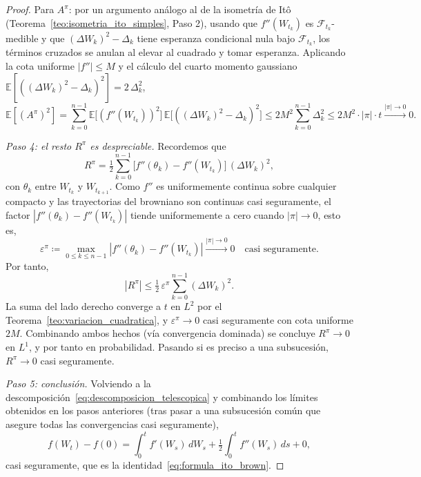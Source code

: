 \documentclass[11pt,a4paper,oneside]{report}
\theoremstyle{plain}
\theoremstyle{definition}
\theoremstyle{remark}
\newcommand{\E}{\mathbb{E}}
\newcommand{\F}{\mathcal{F}}
\newcommand{\1}{\mathbf{1}}
\newcommand{\eqdef}{\coloneqq}
\begin{document}
\begin{proof}
Para $A^\pi$: por un argumento análogo al de la isometría de Itô
(Teorema~\ref{teo:isometria_ito_simples}, Paso 2), usando que
$f''(W_{t_k})$ es $\F_{t_k}$-medible y que $(\Delta W_k)^2 - \Delta_k$
tiene esperanza condicional nula bajo $\F_{t_k}$, los términos
cruzados se anulan al elevar al cuadrado y tomar esperanza. Aplicando
la cota uniforme $|f''| \leq M$ y el cálculo del cuarto momento
gaussiano $\E[((\Delta W_k)^2 - \Delta_k)^2] = 2\, \Delta_k^2$,
\begin{equation*}
  \E[(A^\pi)^2]
  = \sum_{k=0}^{n-1} \E\bigl[(f''(W_{t_k}))^2\bigr]\,
    \E\bigl[((\Delta W_k)^2 - \Delta_k)^2\bigr]
  \leq 2 M^2 \sum_{k=0}^{n-1} \Delta_k^2
  \leq 2 M^2 \cdot |\pi| \cdot t \xrightarrow{|\pi| \to 0} 0.
\end{equation*}

\emph{Paso 4: el resto $R^\pi$ es despreciable.} Recordemos que
\begin{equation*}
  R^\pi = \tfrac{1}{2} \sum_{k=0}^{n-1}
            \bigl[f''(\theta_k) - f''(W_{t_k})\bigr]\, (\Delta W_k)^2,
\end{equation*}
con $\theta_k$ entre $W_{t_k}$ y $W_{t_{k+1}}$. Como $f''$ es uniformemente
continua sobre cualquier compacto y las trayectorias del browniano son
continuas casi seguramente, el factor $|f''(\theta_k) - f''(W_{t_k})|$
tiende uniformemente a cero cuando $|\pi| \to 0$, esto es,
\begin{equation*}
  \varepsilon^\pi \eqdef \max_{0 \leq k \leq n-1}
                          |f''(\theta_k) - f''(W_{t_k})|
                          \xrightarrow{|\pi| \to 0} 0
  \quad \text{casi seguramente}.
\end{equation*}
Por tanto,
\begin{equation*}
  |R^\pi| \leq \tfrac{1}{2}\, \varepsilon^\pi
              \sum_{k=0}^{n-1} (\Delta W_k)^2.
\end{equation*}
La suma del lado derecho converge a $t$ en $L^2$ por el
Teorema~\ref{teo:variacion_cuadratica}, y $\varepsilon^\pi \to 0$ casi
seguramente con cota uniforme $2M$. Combinando ambos hechos (vía
convergencia dominada) se concluye $R^\pi \to 0$ en $L^1$, y por
tanto en probabilidad. Pasando si es preciso a una subsucesión, $R^\pi
\to 0$ casi seguramente.

\emph{Paso 5: conclusión.} Volviendo a la
descomposición~\eqref{eq:descomposicion_telescopica} y combinando los
límites obtenidos en los pasos anteriores (tras pasar a una
subsucesión común que asegure todas las convergencias casi
seguramente),
\begin{equation*}
  f(W_t) - f(0) = \int_0^t f'(W_s)\, dW_s
                + \tfrac{1}{2} \int_0^t f''(W_s)\, ds
                + 0,
\end{equation*}
casi seguramente, que es la identidad~\eqref{eq:formula_ito_brown}.
\end{proof}
\end{document}
